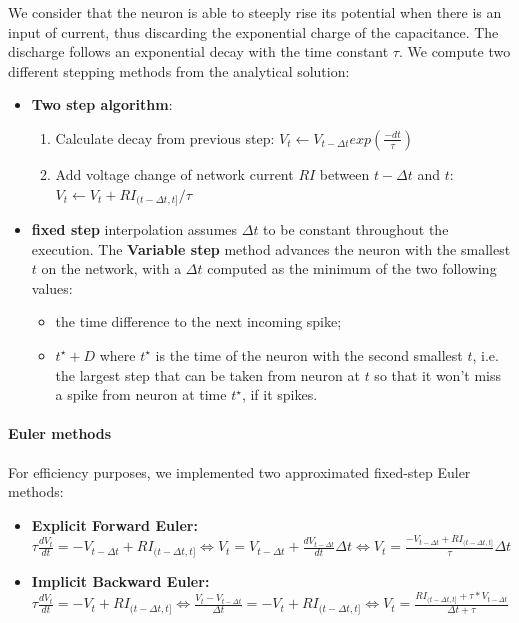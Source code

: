 \documentclass[a4paper]{article}
\begin{document}
We consider that the neuron is able to steeply rise its potential when there is an input of current, thus discarding the exponential charge of the capacitance. The discharge follows an exponential decay with the time constant $\tau$. We compute two different stepping methods from the analytical solution: 
\begin{itemize}
\item \textbf{Two step algorithm}:
\begin{enumerate}
  \item Calculate decay from previous step: $V_t \leftarrow V_{t- \Delta t} exp(\frac{-dt}{\tau})$  
  \item Add voltage change of network current $RI$ between $t-\Delta t$ and $t$: $V_t \leftarrow  V_t + RI_{(t-\Delta t, t]} / \tau $
  \end{enumerate}
\item \textbf{fixed step} interpolation assumes $\Delta t$ to be constant throughout the execution. The \textbf{Variable step} method advances the neuron with the smallest $t$ on the network, with a $\Delta t$ computed as the minimum of the two following values:
\begin{itemize}
\item the time difference to the next incoming spike;
\item $t^\star + D$ where $t^\star$ is the time of the neuron with the second smallest $t$, i.e. the largest step that can be taken from neuron at $t$ so that it won't miss a spike from neuron at time $t^\star$, if it spikes.  
\end{itemize}
\end{itemize}

\paragraph{Euler methods}

For efficiency purposes, we implemented two approximated fixed-step Euler methods:
\begin{itemize}
\item \textbf{Explicit Forward Euler:} $\tau \frac{dV_{t}}{dt} = -V_{t - \Delta t} + RI_{(t-\Delta t, t]} \Leftrightarrow V_t = V_{t - \Delta t} +  \frac{dV_{t- \Delta t}}{dt} \Delta t \Leftrightarrow  V_t = \frac{-V_{t - \Delta t} + RI_{(t-\Delta t, t]}}{\tau} \Delta t$
\item \textbf{Implicit Backward Euler:} $\tau \frac{dV_{t}}{dt} = -V_{t} + RI_{(t-\Delta t, t]} \Leftrightarrow \frac{V_{t} - V_{t - \Delta t}}{\Delta t} = -V_{t} + RI_{(t-\Delta t, t]} \Leftrightarrow V_t = \frac{RI_{(t-\Delta t, t]} + \tau * V_{t-\Delta t}}{\Delta t + \tau}$
\end{itemize}
\end{document}
